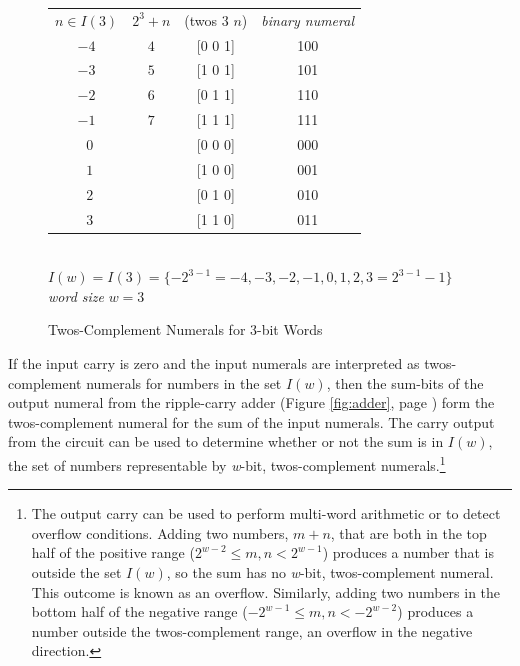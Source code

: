 \begin{figure}
\begin{center}
\begin{tabular}{cccc}
 $n \in I(3)$ & $2^3+n$  & \textsf{(twos $3$ $n$)}   & \emph{binary numeral} \\
 $-4$         & $4$      & \textsf{[0 0 1]}          & 100                   \\
 $-3$         & $5$      & \textsf{[1 0 1]}          & 101                   \\
 $-2$         & $6$      & \textsf{[0 1 1]}          & 110                   \\
 $-1$         & $7$      & \textsf{[1 1 1]}          & 111                   \\
 $~~0$        &          & \textsf{[0 0 0]}          & 000                   \\
 $~~1$        &          & \textsf{[1 0 0]}          & 001                   \\
 $~~2$        &          & \textsf{[0 1 0]}          & 010                   \\
 $~~3$        &          & \textsf{[1 1 0]}          & 011                   \\
\end{tabular}
\\ $I(w) = I(3) = \{-2^{3-1}=-4, -3, -2, -1, 0, 1, 2, 3=2^{3-1}-1\}$
\\ \emph{word size} $w = 3$
\end{center}
\caption{Twos-Complement Numerals for 3-bit Words}
\label{fig:2s-comp-3bit}
\end{figure}

If the input carry is zero and
the input numerals are interpreted
as twos-complement numerals for numbers in the set $I(w)$,
then the sum-bits of the output numeral from the ripple-carry adder
(Figure \ref{fig:adder}, page \pageref{fig:adder})
form the twos-complement numeral for the sum of the input numerals.
The carry output from the circuit can be used to determine
whether or not the sum is in $I(w)$, the set of numbers representable
by \emph{w}-bit, twos-complement numerals.\footnote{The
output carry can be used to perform multi-word arithmetic
or to detect overflow conditions. Adding two numbers, $m+n$,
that are both in the top half of the positive range
($2^{w-2} \leq m, n < 2^{w-1}$) produces a number that is
outside the set $I(w)$, so the sum has no \emph{w}-bit, twos-complement numeral.
This outcome is known as an overflow.
Similarly, adding two numbers in the bottom half of the
negative range ($-2^{w-1} \leq m,n < -2^{w-2}$)
produces a number outside the twos-complement range, an overflow in the negative direction.}

